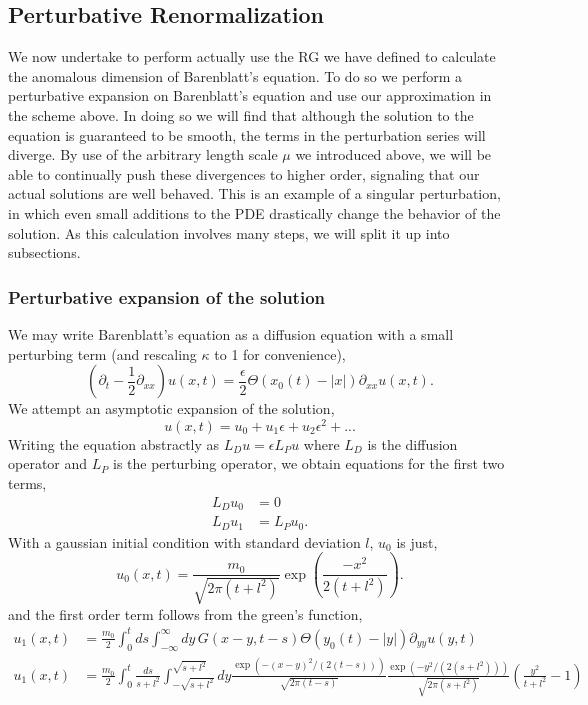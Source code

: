 \subsection{Perturbative Renormalization}

We now undertake to perform actually use the RG we have defined to calculate the anomalous
dimension of Barenblatt's equation.  To do so we perform a perturbative expansion on Barenblatt's
equation and use our approximation in the scheme above.  In doing so we will find that
although the solution to the equation is guaranteed to be smooth, the terms in the perturbation
series will diverge.  By use of the arbitrary length scale $\mu$ we introduced above, we will be
able to continually push these divergences to higher order, signaling that our actual
solutions are well behaved.  This is an example of a singular perturbation, in which even small
additions to the PDE drastically change the behavior of the solution.  As this calculation involves
many steps, we will split it up into subsections.

\subsubsection{ Perturbative expansion of the solution}

We may write Barenblatt's equation as a diffusion equation with a small perturbing term (and 
rescaling $\kappa$ to 1 for convenience),
\[\left(\partial_t - \frac{1}{2} \partial_{xx}\right) u(x, t) = 
\frac{\epsilon}{2}\Theta(x_0(t) - |x|) \partial_{xx} u(x, t).\]
We attempt an asymptotic expansion of the solution,
\[u(x, t) = u_0 + u_1\epsilon + u_2 \epsilon^2 +...\]
Writing the equation abstractly as $L_D u = \epsilon L_P u$ where $L_D$ is the diffusion operator and
$L_P$ is the perturbing operator, we obtain equations for the first two terms,
\begin{align*}
L_D u_0 &= 0 \\
L_D u_1 &= L_P u_0.
\end{align*}
With a gaussian initial condition with standard deviation $l$, $u_0$ is just,
\[u_0(x, t) = \frac{m_0}{\sqrt{2\pi(t + l^2)}}\exp\left(\frac{-x^2}{2(t+l^2)} \right).\]
and the first order term follows from the green's function,
\begin{align*}
u_1(x, t) &= \frac{m_0}{2}\int_0^t ds \int_{-\infty}^\infty dy\, G(x-y, t-s)\Theta(y_0(t) - |y|) \partial_{yy} u(y, t) \\
u_1(x, t) &= \frac{m_0}{2}\int_0^t \frac{ds}{s+l^2}  \int_{-\sqrt{s+l^2}}^{\sqrt{s+l^2}} dy
\frac{\exp(-(x-y)^2/(2(t-s)))}{\sqrt{2\pi(t-s)}}\frac{\exp(-y^2/(2(s+l^2)))}{\sqrt{2\pi(s+l^2)}}
\left(\frac{y^2}{t+l^2} - 1\right)
\end{align*}
